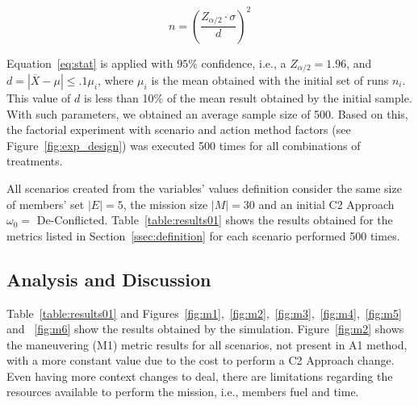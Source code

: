 \begin{equation}
    \label{eq:stat}
    n=\left(\frac{Z_{\alpha/2} \cdot \sigma}{d}\right)^2
\end{equation}

Equation~\ref{eq:stat} is applied with $95\%$ confidence, i.e., a $Z_{\alpha/2} = 1.96$, and $d = |\overline{X} - \mu| \leq .1\mu_i$, where $\mu_i$ is the mean obtained with the initial set of runs $n_i$. This value of $d$ is less than 10\% of the mean result obtained by the initial sample. With such parameters, we obtained an average sample size of 500. Based on this, the factorial experiment with scenario and action method factors (see Figure~\ref{fig:exp_design}) was executed 500 times for all combinations of treatments. 

All scenarios created from the variables' values definition consider the same size of members' set $|E|=5$, the mission size $|M|=30$ and an initial C2 Approach $\omega_0 =$ De-Conflicted. Table~\ref{table:results01} shows the results obtained for the metrics listed in Section~\ref{ssec:definition} for each scenario performed 500 times. 



\subsection{Analysis and Discussion}


Table~\ref{table:results01} and Figures~\ref{fig:m1},~\ref{fig:m2},~\ref{fig:m3},~\ref{fig:m4},~\ref{fig:m5} and ~\ref{fig:m6} show the results obtained by the simulation. Figure~\ref{fig:m2} shows the maneuvering (M1) metric results for all scenarios, not present in A1 method, with a more constant value due to the cost to perform a C2 Approach change. Even having more context changes to deal, there are limitations regarding the resources available to perform the mission, i.e., members fuel and time.


